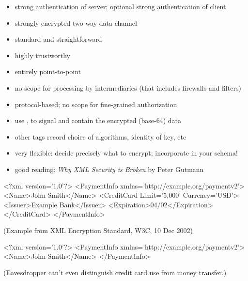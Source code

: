 \documentclass{sepslide-soa-faked} %
\def\colourbullet#1{\item[#1]}
\def\colourbullet#1{\item[\large\textbf{\textcolor{BulletColor}{#1}}]}
\def\pro{\colourbullet{(+)}}
\def\con{\colourbullet{(--)}}
\begin{document}
\begin{slide}
	\begin{itemize}
	\item strong authentication of server; 
		optional strong authentication of client
	\item strongly encrypted two-way data channel
	\pro standard and straightforward
	\pro highly trustworthy
	\con entirely point-to-point
	\con no scope for processing by intermediaries
	        (that includes firewalls and filters)
	\con protocol-based; no scope for fine-grained authorization
	\end{itemize}
\end{slide}

\begin{slide}
	\begin{itemize}
	\item use , 
		to signal and contain the encrypted (base-64) data
	\item other tags record choice of algorithms, identity of key, etc
	\item very flexible: decide precisely what to encrypt; 
		incorporate in your schema!
        \item good reading: \textit{Why XML Security is Broken} by Peter Gutmann
	\end{itemize}
\end{slide}

\begin{slide}
\begin{xml}
<?xml version='1.0'?>
  <PaymentInfo xmlns='http://example.org/paymentv2'>
    <Name>John Smith</Name>
    <CreditCard Limit='5,000' Currency='USD'>
      <Issuer>Example Bank</Issuer>
      <Expiration>04/02</Expiration>
    </CreditCard>
  </PaymentInfo>
\end{xml}
(Example from XML Encryption Standard, W3C, 10 Dec 2002)
\end{slide}

\begin{slide}
\begin{xml}
  <?xml version='1.0'?>
  <PaymentInfo xmlns='http://example.org/paymentv2'>
    <Name>John Smith</Name>
  </PaymentInfo>
\end{xml}
(Eavesdropper can't even distinguish credit card use from money transfer.)
\end{slide}
\end{document}
